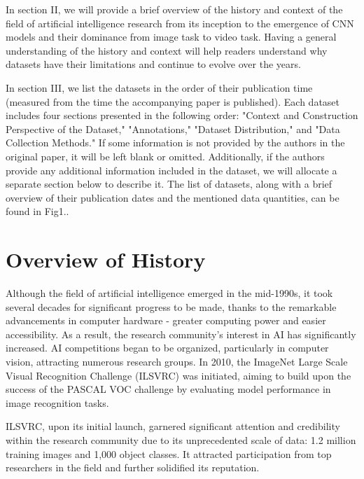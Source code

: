 \documentclass[10pt,onecolumn,letterpaper]{article}
\begin{document}
In section II, we will provide a brief overview of the history and context of
the field of artificial intelligence research from its inception to the
emergence of CNN models and their dominance from image task to video task.
Having a general understanding of the history and context will help readers
understand why datasets have their limitations and continue to evolve over the
years.

In section III, we list the datasets in the order of their publication time
(measured from the time the accompanying paper is published). Each dataset
includes four sections presented in the following order: "Context
and Construction Perspective of the Dataset," "Annotations," "Dataset
Distribution," and "Data Collection Methods." If some information is not
provided by the authors in the original paper, it will be left blank or omitted.
Additionally, if the authors provide any additional information included in the
dataset, we will allocate a separate section below to describe it. The list of
datasets, along with a brief overview of their publication dates and the
mentioned data quantities, can be found in Fig1..

\section{Overview of History}

Although the field of artificial intelligence emerged in the mid-1990s, it took
several decades for significant progress to be made, thanks to the remarkable
advancements in computer hardware - greater computing power and easier
accessibility. As a result, the research community's interest in AI has
significantly increased. AI competitions began to be organized, particularly in
computer vision, attracting numerous research groups. In 2010, the ImageNet
Large Scale Visual Recognition Challenge (ILSVRC) \cite{ILSVRC} was initiated,
aiming to build upon the success of the PASCAL VOC challenge \cite{PASCALVOC} by
evaluating model performance in image recognition tasks.

ILSVRC, upon its initial launch, garnered significant attention and credibility
within the research community due to its unprecedented scale of data: 1.2
million training images and 1,000 object classes. It attracted participation
from top researchers in the field and further solidified its reputation.
\end{document}
